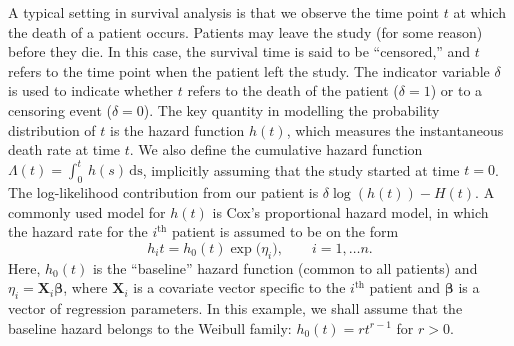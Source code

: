 \documentclass{admbmanual}
\begin{document}
\label{sec:kidney_example}
A typical setting in survival analysis is that we observe the time point $t$ at
which the death of a patient occurs. Patients may leave the study (for some
reason) before they die. In this case, the survival time is said to be
``censored,'' and $t$ refers to the time point when the patient left the study.
The indicator variable $\delta$ is used to indicate whether $t$ refers to the
death of the patient ($\delta=1$) or to a censoring event ($\delta=0$). The key
quantity in modelling the probability distribution of $t$ is the hazard
function $h(t)$, which measures the instantaneous death rate at time $t$. We
also define the cumulative hazard function $\Lambda(t)=\int_0^t \,
h(s)\,\textrm{ds}$, implicitly assuming that the study started at time $t=0$.
The log-likelihood contribution from our patient is $\delta\log(h(t))-H(t)$. A
commonly used model for $h(t)$ is Cox's proportional hazard model, in which the
hazard rate for the $i^{\textrm{th}}$ patient is assumed to be on the form
\[
h_it = h_0(t)\exp(\eta_i\mathbf), \qquad i=1,\ldots n.
\]
Here, $h_0(t)$ is the ``baseline'' hazard function (common to all patients) and
$\eta_i=\mathbf{X}_i\mathbf{\beta}$, where $\mathbf{X}_i$ is a covariate vector
specific to the $i^{\textrm{th}}$ patient and $\mathbf{\beta}$ is a vector of
regression parameters. In this example, we shall assume that the baseline hazard
belongs to the Weibull family: $h_0(t)=rt^{r-1}$ for $r>0$.
\end{document}
